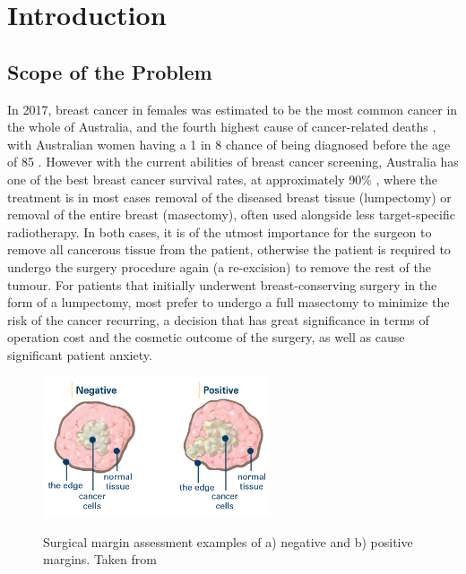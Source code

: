  \chapter{Introduction}

\section{Scope of the Problem}\label{problem}
In 2017, breast cancer in females was estimated to be the most common cancer in the whole of Australia, and the fourth highest cause of cancer-related deaths \cite{australian_institute_of_health_and_welfare_cancer_2017}, with Australian women having a 1 in 8 chance of being diagnosed before the age of 85 \cite{australian_institute_of_health_and_welfare_breast_2012}. However with the current abilities of breast cancer screening, Australia has one of the best breast cancer survival rates, at approximately 90\% \cite{australian_institute_of_health_and_welfare_breast_2012}, where the treatment is in most cases removal of the diseased breast tissue (lumpectomy) or removal of the entire breast (masectomy), often used alongside less target-specific radiotherapy. In both cases, it is of the utmost importance for the surgeon to remove all cancerous tissue from the patient, otherwise the patient is required to undergo the surgery procedure again (a re-excision) to remove the rest of the tumour. For patients that initially underwent breast-conserving surgery in the form of a lumpectomy, most prefer to undergo a full masectomy to minimize the risk of the cancer recurring, a decision that has great significance in terms of operation cost and the cosmetic outcome of the surgery, as well as cause significant patient anxiety.

\begin{figure}
	\centering
    \includegraphics[width=0.6\textwidth]{figures/margins.png}
    \label{margins}
    \caption{Surgical margin assessment examples of a) negative and b) positive margins. Taken from \cite{breastcancer.org_surgical_2017}}
\end{figure}

